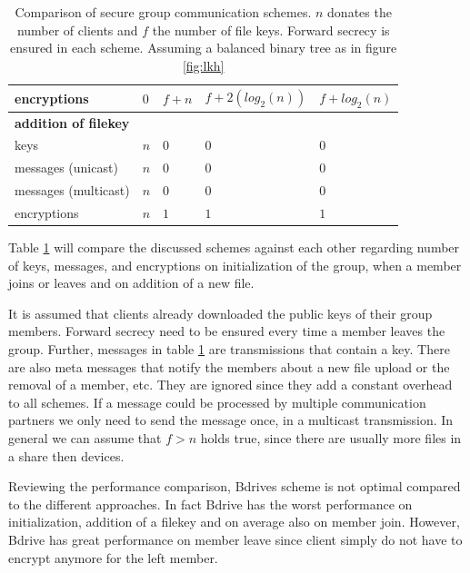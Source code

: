 \begin{table}[!ht]
\begin{tabular}{l 		| l 						| l 							| l 						| l 						}
encryptions 			& $0$						& $f + n$ 						& $f + 2 (log_2(n))$ 		& $f + log_2(n)$	 		\\ %
\hline	
\textbf{addition of filekey}																																\\
keys 					& $n$		 				& $0$							& $0$	 					& $0$		 				\\ %
messages (unicast)		& $n$		 				& $0$	 						& $0$ 						& $0$		 				\\ %
messages (multicast)	& $n$ 						& $0$ 							& $0$ 						& $0$	 					\\ %
encryptions				& $n$ 						& $1$ 							& $1$ 						& $1$		 				\\ %
\hline
\end{tabular}
\caption{Comparison of secure group communication schemes. $n$ donates the number of clients and $f$ the number of file keys. Forward secrecy is ensured in each scheme. Assuming a balanced binary tree as in figure \ref{fig:lkh}}
\label{tab:comparisons}
\end{table}

Table \ref{tab:comparisons} will compare the discussed schemes against each other regarding number of keys, messages, and encryptions on initialization of the group, when a member joins or leaves and on addition of a new file. 

It is assumed that clients already downloaded the public keys of their group members. Forward secrecy need to be ensured every time a member leaves the group.
Further, messages in table \ref{tab:comparisons} are transmissions that contain a key. There are also meta messages that notify the members about a new file upload or the removal of a member, etc.  They are ignored since they add a constant overhead to all schemes.  If a message could be processed by multiple communication partners we only need to send the message once, in a multicast transmission. In general we can assume that $f > n$ holds true, since there are usually more files in a share then devices.

Reviewing the performance comparison, Bdrives scheme is not optimal compared to the different approaches. In fact Bdrive has the worst performance on initialization, addition of a filekey and on average also on member join. However, Bdrive has great performance on member leave since client simply do not have to encrypt anymore for the left member.

